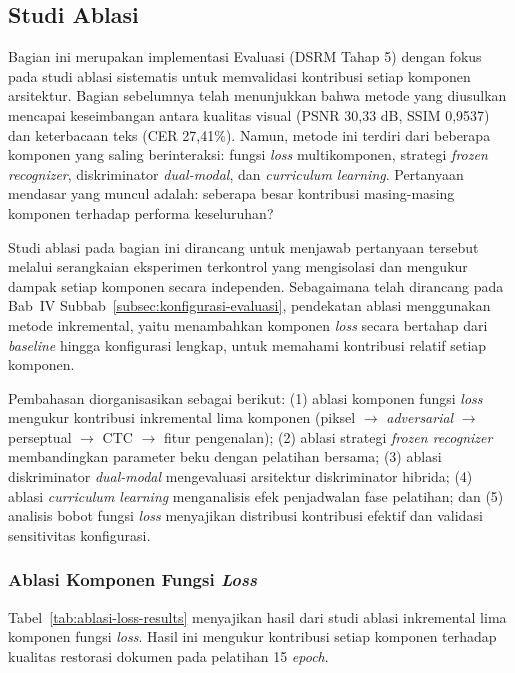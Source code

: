 

\subsection{Studi Ablasi}
\label{subsec:studi-ablasi}

Bagian ini merupakan implementasi Evaluasi (DSRM Tahap 5) dengan fokus pada studi ablasi sistematis untuk memvalidasi kontribusi setiap komponen arsitektur. Bagian sebelumnya telah menunjukkan bahwa metode yang diusulkan mencapai keseimbangan antara kualitas visual (PSNR 30,33 dB, SSIM 0,9537) dan keterbacaan teks (CER 27,41\%). Namun, metode ini terdiri dari beberapa komponen yang saling berinteraksi: fungsi \textit{loss} multikomponen, strategi \textit{frozen recognizer}, diskriminator \textit{dual-modal}, dan \textit{curriculum learning}. Pertanyaan mendasar yang muncul adalah: seberapa besar kontribusi masing-masing komponen terhadap performa keseluruhan?

Studi ablasi pada bagian ini dirancang untuk menjawab pertanyaan tersebut melalui serangkaian eksperimen terkontrol yang mengisolasi dan mengukur dampak setiap komponen secara independen. Sebagaimana telah dirancang pada Bab~IV Subbab~\ref{subsec:konfigurasi-evaluasi}, pendekatan ablasi menggunakan metode inkremental, yaitu menambahkan komponen \textit{loss} secara bertahap dari \textit{baseline} hingga konfigurasi lengkap, untuk memahami kontribusi relatif setiap komponen.

Pembahasan diorganisasikan sebagai berikut: (1) ablasi komponen fungsi \textit{loss} mengukur kontribusi inkremental lima komponen (piksel $\rightarrow$ \textit{adversarial} $\rightarrow$ perseptual $\rightarrow$ CTC $\rightarrow$ fitur pengenalan); (2) ablasi strategi \textit{frozen recognizer} membandingkan parameter beku dengan pelatihan bersama; (3) ablasi diskriminator \textit{dual-modal} mengevaluasi arsitektur diskriminator hibrida; (4) ablasi \textit{curriculum learning} menganalisis efek penjadwalan fase pelatihan; dan (5) analisis bobot fungsi \textit{loss} menyajikan distribusi kontribusi efektif dan validasi sensitivitas konfigurasi.

\subsubsection{Ablasi Komponen Fungsi \textit{Loss}}
\label{subsubsec:hasil-ablasi-loss}

Tabel~\ref{tab:ablasi-loss-results} menyajikan hasil dari studi ablasi inkremental lima komponen fungsi \textit{loss}. Hasil ini mengukur kontribusi setiap komponen terhadap kualitas restorasi dokumen pada pelatihan 15 \textit{epoch}.

